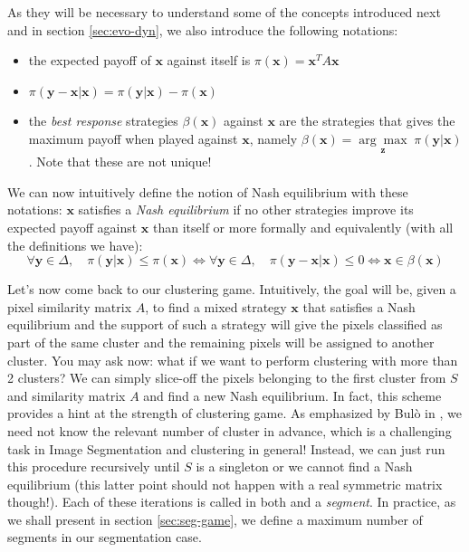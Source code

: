 \documentclass[11pt,a4paper]{article}
\begin{document}
As they will be necessary to understand some of the concepts introduced next and in section \ref{sec:evo-dyn}, we also introduce the following notations:
\begin{itemize}
    \item the expected payoff of $\mathbf{x}$ against itself is $\pi(\mathbf{x})=\mathbf{x}^TA\mathbf{x}$
    \item $\pi(\mathbf{y}-\mathbf{x}|\mathbf{x}) = \pi(\mathbf{y}|\mathbf{x}) - \pi(\mathbf{x})$
    \item the \textit{best response} strategies $\beta(\mathbf{x})$ against $\mathbf{x}$ are the strategies that gives the maximum payoff when played against $\mathbf{x}$, namely $\beta(\mathbf{x})=\underset{\mathbf{z}}{\arg\max}\;\pi(\mathbf{y}|\mathbf{x})$. Note that these are not unique!
\end{itemize}

We can now intuitively define the notion of Nash equilibrium with these notations: $\mathbf{x}$ satisfies a \textit{Nash equilibrium} if no other strategies improve its expected payoff against $\mathbf{x}$ than itself or more formally and equivalently (with all the definitions we have):
\begin{equation}
    \forall \mathbf{y}\in\Delta,\quad  \pi(\mathbf{y}|\mathbf{x}) \leq \pi(\mathbf{x}) \iff \forall \mathbf{y}\in\Delta,\quad  \pi(\mathbf{y} - \mathbf{x}|\mathbf{x}) \leq 0 \iff \mathbf{x} \in \beta(\mathbf{x})
\end{equation}

Let's now come back to our clustering game. Intuitively, the goal will be, given a pixel similarity matrix $A$, to find a mixed strategy $\mathbf{x}$ that satisfies a Nash equilibrium and the support of such a strategy will give the pixels classified as part of the same cluster and the remaining pixels will be assigned to another cluster. You may ask now: what if we want to perform clustering with more than 2 clusters? We can simply slice-off the pixels belonging to the first cluster from $S$ and similarity matrix $A$ and find a new Nash equilibrium. In fact, this scheme provides a hint at the strength of clustering game. As emphasized by Bulò in \cite{bulo-thesis}, we need not know the relevant number of cluster in advance, which is a challenging task in Image Segmentation and clustering in general! Instead, we can just run this procedure recursively until $S$ is a singleton or we cannot find a Nash equilibrium (this latter point should not happen with a real symmetric matrix though!). Each of these iterations is called in both \cite{bulo-thesis} and \cite{game-clustering} a \textit{segment}. In practice, as we shall present in section \ref{sec:seg-game}, we define a maximum number of segments in our segmentation case.
\end{document}
